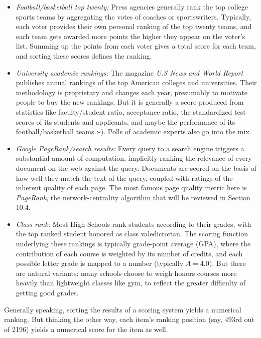\documentclass[10pt]{article}
\begin{document}
\begin{itemize}
    \item \textit{Football/basketball top twenty:} Press agencies generally rank the top college sports teams by aggregating the votes of coaches or sportswriters. Typically, each voter provides their own personal ranking of the top twenty teams, and each team gets awarded more points the higher they appear on the voter's list. Summing up the points from each voter gives a total score for each team, and sorting these scores defines the ranking.
    \item \textit{University academic rankings:} The magazine \textit{U.S News and World Report} publishes annual rankings of the top American colleges and universities. Their methodology is proprietary and changes each year, presumably to motivate people to buy the new rankings. But it is generally a score produced from statistics like faculty/student ratio, acceptance ratio, the standardized test scores of its students and applicants, and maybe the performance of its football/basketball teams :-). Polls of academic experts also go into the mix.
    \item \textit{Google PageRank/search results:} Every query to a search engine triggers a substantial amount of computation, implicitly ranking the relevance of every document on the web against the query. Documents are scored on the basis of how well they match the text of the query, coupled with ratings of the inherent quality of each page. The most famous page quality metric here is \textit{PageRank}, the network-centrality algorithm that will be reviewed in Section 10.4.
    \item \textit{Class rank:} Most High Schools rank students according to their grades, with the top ranked student honored as class valedictorian. The scoring function underlying these rankings is typically grade-point average (GPA), where the contribution of each course is weighted by its number of credits, and each possible letter grade is mapped to a number (typically $A=4.0)$. But there are natural variants: many schools choose to weigh honors courses more heavily than lightweight classes like gym, to reflect the greater difficulty of getting good grades.
\end{itemize}

Generally speaking, sorting the results of a scoring system yields a numerical ranking. But thinking the other way, each item's ranking position (say, 493rd out of 2196) yields a numerical score for the item as well.
\end{document}

